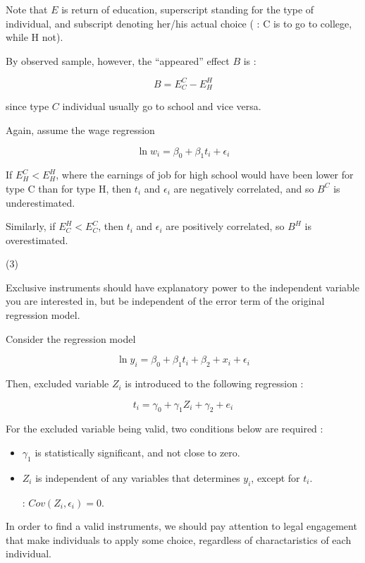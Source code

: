 \documentclass[dvipdfmx]{jsarticle}
\begin{document}
\begin{enumerate}
\begin{itemize}
  Note that $E$ is return of education, superscript standing for the type of individual, and subscript denoting her/his actual choice ( : C is to go to college, while H not).
  
  By observed sample, however, the ``appeared'' effect $B$ is :
  
  \[ B = E_C^C - E_H^H \]
  
  since type $C$ individual usually go to school and vice versa.
  
  Again, assume the wage regression
  
  \[ \ln w_i = \beta_0 + \beta_1 t_i + \epsilon_i \]
  
  If $E_H^C < E_H^H$, where the earnings of job for high school would have been lower for type C than for type H, then $t_i$ and $\epsilon_i$ are negatively correlated, and so $B^C$ is underestimated.
  
  Similarly, if $E_C^H < E_C^C$, then $t_i$ and $\epsilon_i$ are positively correlated, so $B^H$ is overestimated.
  
  \end{itemize}
 
 (3)
 
 Exclusive instruments should have explanatory power to the independent variable you are interested in, but be independent of the error term of the original regression model.
 
 Consider the regression model
 
 \[ \ln y_i = \beta_0 + \beta_1 t_i + \beta_2 + x_i + \epsilon_i \]
 
 Then, excluded variable $Z_i$ is introduced to the following regression :
 
 \[t_i = \gamma_0 + \gamma_1 Z_i + \gamma_2 + e_i \]
 
 For the excluded variable being valid, two conditions below are required :
 
  \begin{itemize}
  
  \item $\gamma_1$ is statistically significant, and not close to zero.
  
  \item $Z_i$ is independent of any variables that determines $y_i$, except for $t_i$.
  
  : $Cov(Z_i, \epsilon_i) = 0$.
  
  \end{itemize} 
 
 In order to find a valid instruments, we should pay attention to legal engagement that make individuals to apply some choice, regardless of charactaristics of each individual. 
 

\end{enumerate}
\end{document}
